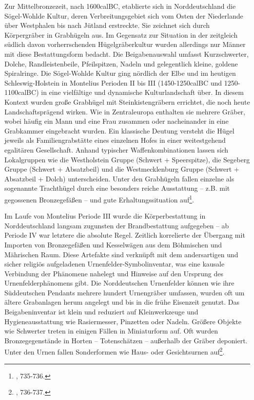 \documentclass[openany,twoside,twocolumn]{book}
\let\rmarkdownfootnote\footnote%
\def\footnote{\protect\rmarkdownfootnote}
\begin{document}
Zur Mittelbronzezeit, nach 1600calBC, etablierte sich in Norddeutschland
die Sögel-Wohlde Kultur, deren Verbreitungsgebiet sich vom Osten der
Niederlande über Westphalen bis nach Jütland erstreckte. Sie zeichnet
sich durch Körpergräber in Grabhügeln aus. Im Gegensatz zur Situation in
der zeitgleich südlich davon vorherrschenden Hügelgräberkultur wurden
allerdings nur Männer mit diese Bestattungsform bedacht. Die
Beigabenauswahl umfasst Kurzschwerter, Dolche, Randleistenbeile,
Pfeilspitzen, Nadeln und gelegentlich kleine, goldene Spiralringe. Die
Sögel-Wohlde Kultur ging nördlich der Elbe und im heutigen
Schleswig-Holstein in Montelius Perioden II bis III (1450-1250calBC und
1250-1100calBC) in eine vielfältige und dynamische Kulturlandschaft
über. In diesem Kontext wurden große Grabhügel mit Steinkistengräbern
errichtet, die noch heute Landschaftsprägend wirken. Wie in
Zentraleuropa enthalten sie mehrere Gräber, wobei häufig ein Mann und
eine Frau zusammen oder nacheinander in eine Grabkammer eingebracht
wurden. Ein klassische Deutung versteht die Hügel jeweils als
Familiengrabstätte eines einzelnen Hofes in einer weitestgehend
egalitären Gesellschaft. Anhand typischer Waffenkombinationen lassen
sich Lokalgruppen wie die Westholstein Gruppe (Schwert + Speerspitze),
die Segeberg Gruppe (Schwert + Absatzbeil) und die Westmecklenburg
Gruppe (Schwert + Absatzbeil + Dolch) unterscheiden. Unter den
Grabhügeln fallen einzelne als sogenannte Trachthügel durch eine
besonders reiche Ausstattung -- z.B. mit gegossenen Bronzegefäßen -- und
gute Erhaltungssituation auf\footnote{\textcite{jockenhovel_germany_2013},
  735-736.}.

Im Laufe von Montelius Periode III wurde die Körperbestattung in
Norddeutschland langsam zugunsten der Brandbestattung aufgegeben -- ab
Periode IV war letztere die absolute Regel. Zeitlich korrelierte der
Übergang mit Importen von Bronzegefäßen und Kesselwägen aus dem
Böhmischen und Mährischen Raum. Diese Artefakte sind verknüpft mit dem
andersartigen und sicher religiös aufgeladenen
Urnenfelder-Symbolinventar, was eine kausale Verbindung der Phänomene
nahelegt und Hinweise auf den Ursprung des Urnenfelderphänomens gibt.
Die Norddeutschen Urnenfelder können wie ihre Süddeutschen Pendants
mehrere hundert Urnengräber umfassen, wurden oft um ältere Grabanlagen
herum angelegt und bis in die frühe Eisenzeit genutzt. Das
Beigabeninventar ist klein und reduziert auf Kleinwerkzeuge und
Hygieneausstattung wie Rasiermesser, Pinzetten oder Nadeln. Größere
Objekte wie Schwerter treten in einigen Fällen in Miniaturform auf. Oft
wurden Bronzegegenstände in Horten -- Totenschätzen -- außerhalb der
Gräber deponiert. Unter den Urnen fallen Sonderformen wie Haus- oder
Gesichtsurnen auf\footnote{\textcite{jockenhovel_germany_2013}, 736-737.}.
\end{document}

